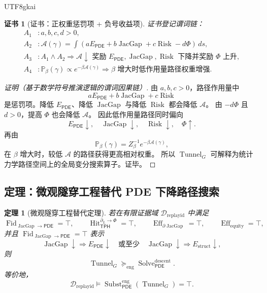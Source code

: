 \documentclass[12pt]{article}
\newtheorem{theorem}{定理}[section]
\newtheorem{Certificate}{证书}[section]
\newcommand{\TPH}{\ensuremath{\mathsf{TPH}}}
\newcommand{\PDE}{\ensuremath{\mathsf{PDE}}}
\DeclareMathOperator{\Eff}{Eff}
\DeclareMathOperator{\Hit}{Hit}
\DeclareMathOperator{\JacGap}{JacGap}
\DeclareMathOperator{\Risk}{Risk}
\DeclareMathOperator{\Tunnel}{Tunnel}
\DeclareMathOperator{\Subst}{Subst}
\DeclareMathOperator{\Solve}{Solve}
\DeclareMathOperator{\Fid}{Fid}
\begin{document}
\begin{CJK*}{UTF8}{gkai}
\begin{Certificate}[证书：正权重惩罚项 + 负号收益项]
\label{cert:tex58-path-action}
证书登记谓词链：
\[
\begin{aligned}
  A_1 &: a,b,c,d>0,\\
  A_2 &: \mathcal A(\gamma)
  =
  \int(aE_{\PDE}+b\JacGap+c\Risk-d\Phi)\,ds,\\
  A_3 &: A_1\wedge A_2
  \Rightarrow
  \mathcal A\downarrow\text{ 奖励 }E_{\PDE},\JacGap,\Risk\text{ 下降并奖励 }\Phi\text{ 上升},\\
  A_4 &: \mathbb P_\beta(\gamma)\propto e^{-\beta\mathcal A(\gamma)}
  \Rightarrow
  \beta\text{ 增大时低作用量路径权重增强}.
\end{aligned}
\]
\end{Certificate}

\begin{proof}[证明（基于数学符号推演逻辑的谓词因果链）]
由 \(a,b,c>0\)，路径作用量中
\[
  aE_{\PDE}+b\JacGap+c\Risk
\]
是惩罚项。降低 \(E_{\PDE}\)、降低 \(\JacGap\) 与降低 \(\Risk\) 都会降低 \(\mathcal A\)。
由 \(-d\Phi\) 且 \(d>0\)，提高 \(\Phi\) 也会降低 \(\mathcal A\)。
因此低作用量路径同时偏向
\[
  E_{\PDE}\downarrow,\quad
  \JacGap\downarrow,\quad
  \Risk\downarrow,\quad
  \Phi\uparrow.
\]
再由
\[
  \mathbb P_\beta(\gamma)
  =
  Z_\beta^{-1}e^{-\beta\mathcal A(\gamma)},
\]
在 \(\beta\) 增大时，较低 \(\mathcal A\) 的路径获得更高相对权重。
所以 \(\Tunnel_G\) 可解释为统计力学路径空间上的全局变分搜索算子。证毕。
\end{proof}

\subsection{定理：微观隧穿工程替代 PDE 下降路径搜索}
\label{subsec:tex58-tunnel-substitution-theorem}

\begin{theorem}[微观隧穿工程替代定理]
\label{thm:tex58-tunnel-engineering-substitution}
若在有限证据域 \(\mathcal D_{\mathrm{replayid}}\) 中满足
\[
  \Fid_{\JacGap\to\PDE}=\top,
  \qquad
  \Hit_{\TPH}^{\partial_L\to\Phi}=\top,
  \qquad
  \Eff_{\partial\JacGap}=\top,
  \qquad
  \Eff_{\mathrm{equity}}=\top,
\]
并且 \(\Fid_{\JacGap\to\PDE}=\top\) 表示
\[
  \JacGap\downarrow
  \Rightarrow
  E_{\PDE}\downarrow
  \quad\text{或至少}\quad
  \JacGap\downarrow
  \Rightarrow
  E_{\mathrm{struct}}\downarrow,
\]
则
\[
  \Tunnel_G
  \succcurlyeq_{\mathrm{eng}}
  \Solve_{\PDE}^{\mathrm{descent}}.
\]
等价地，
\[
  \mathcal D_{\mathrm{replayid}}
  \models
  \Subst_{\PDE}^{\mathrm{eng}}(\Tunnel_G)=\top.
\]
\end{theorem}


\end{CJK*}
\end{document}
